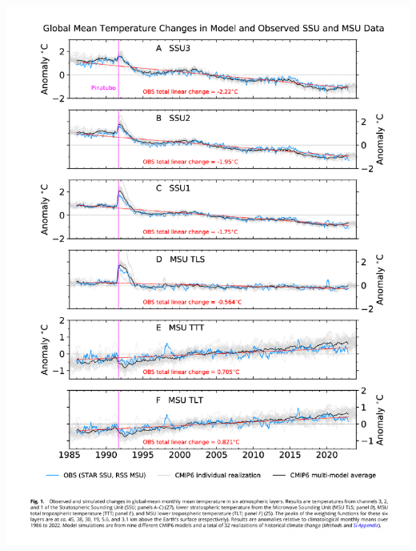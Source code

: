 \documentclass[12pt]{article}
\begin{document}
\begin{center}
\includegraphics[width=\textwidth]{images/santer2023.pdf}
\end{center}


\vspace{2cm} 

\end{document}
